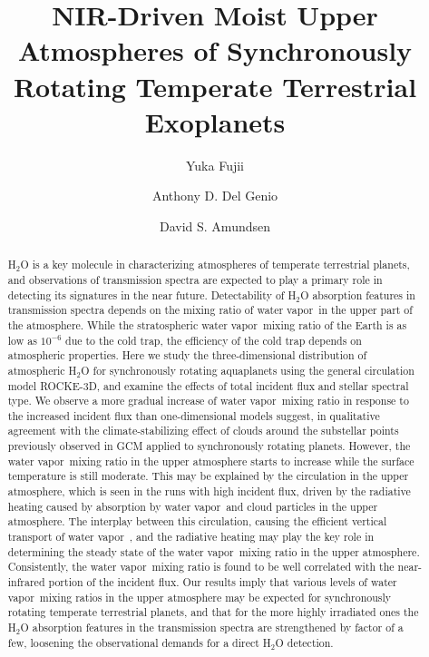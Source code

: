 \documentclass[11pt,numberedappendix,twocolappendix,]{emulateapj}
\def\water{H$_2$O }
\newcommand{\wv}{water vapor\ }
\begin{document}
\title{NIR-Driven Moist Upper Atmospheres of Synchronously Rotating Temperate Terrestrial Exoplanets}
\author{Yuka Fujii}
\author{Anthony D. Del Genio}
\author{David S. Amundsen}

\begin{abstract}

\water is a key molecule in characterizing atmospheres of temperate terrestrial planets, and observations of transmission spectra are expected to play a primary role in detecting its signatures in the near future. 
%
Detectability of \water absorption features in transmission spectra depends on the mixing ratio of \wv in the upper part of the atmosphere. 
%
While the stratospheric \wv mixing ratio of the Earth is as low as $10^{-6}$ due to the cold trap, the efficiency of the cold trap depends on atmospheric properties. 
%
Here we study the three-dimensional distribution of atmospheric \water for synchronously rotating aquaplanets using the general circulation model ROCKE-3D, and examine the effects of total incident flux and stellar spectral type.  
%
We observe a more gradual increase of \wv mixing ratio in response to the increased incident flux than one-dimensional models suggest, in qualitative agreement with the climate-stabilizing effect of clouds around the substellar points previously observed in GCM applied to synchronously rotating planets. 
%
However, the \wv mixing ratio in the upper atmosphere starts to increase  while the surface temperature is still moderate. 
%
This may be explained by the circulation in the upper atmosphere, which is seen in the runs with high incident flux, driven by the radiative heating caused by absorption by \wv and cloud particles in the upper atmosphere. 
%
The interplay between this circulation, causing the efficient vertical transport of \wv, and the radiative heating may play the key role in determining the steady state of the \wv mixing ratio in the upper atmosphere. 
%
Consistently, the \wv mixing ratio is found to be well correlated with the near-infrared portion of the incident flux. 
%
Our results imply that various levels of \wv mixing ratios in the upper atmosphere may be expected for synchronously rotating temperate terrestrial planets, and that for the more highly irradiated ones the \water absorption features in the transmission spectra are strengthened by factor of a few, loosening the observational demands for a direct \water detection. 
%
\end{abstract}
\end{document}
